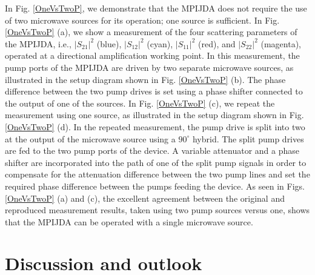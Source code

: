\documentclass[aip,onecolumn,10pt]{revtex4}%
\begin{document}
In Fig. \ref{OneVsTwoP}, we demonstrate that the MPIJDA does not require the use of two microwave sources for its operation; one source is sufficient. In Fig. \ref{OneVsTwoP} (a), we show a measurement of the four scattering parameters of the MPIJDA, i.e., $|S_{21}|^2$ (blue), $|S_{12}|^2$ (cyan), $|S_{11}|^2$ (red), and $|S_{22}|^2$ (magenta), operated at a directional amplification working point. In this measurement, the pump ports of the MPIJDA are driven by two separate microwave sources, as illustrated in the setup diagram shown in Fig. \ref{OneVsTwoP} (b). The phase difference between the two pump drives is set using a phase shifter connected to the output of one of the sources. In Fig. \ref{OneVsTwoP} (c), we repeat the measurement using one source, as illustrated in the setup diagram shown in Fig. \ref{OneVsTwoP} (d). In the repeated measurement, the pump drive is split into two at the output of the microwave source using a $90^{\circ}$ hybrid. The split pump drives are fed to the two pump ports of the device. A variable attenuator and a phase shifter are incorporated into the path of one of the split pump signals in order to compensate for the attenuation difference between the two pump lines and set the required phase difference between the pumps feeding the device. As seen in Figs. \ref{OneVsTwoP} (a) and (c), the excellent agreement between the original and reproduced measurement results, taken using two pump sources versus one, shows that the MPIJDA can be operated with a single microwave source.  

\section{Discussion and outlook}
\end{document}
